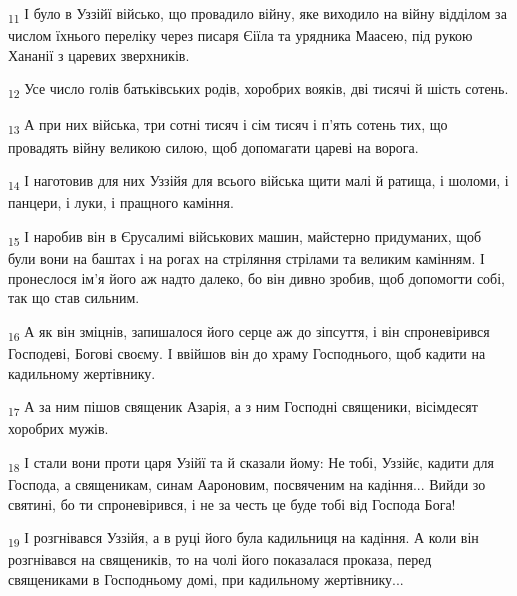\begin{tcolorbox}
\textsubscript{11} І було в Уззійї військо, що провадило війну, яке виходило на війну відділом за числом їхнього переліку через писаря Єіїла та урядника Маасею, під рукою Хананії з царевих зверхників.
\end{tcolorbox}
\begin{tcolorbox}
\textsubscript{12} Усе число голів батьківських родів, хоробрих вояків, дві тисячі й шість сотень.
\end{tcolorbox}
\begin{tcolorbox}
\textsubscript{13} А при них війська, три сотні тисяч і сім тисяч і п'ять сотень тих, що провадять війну великою силою, щоб допомагати цареві на ворога.
\end{tcolorbox}
\begin{tcolorbox}
\textsubscript{14} І наготовив для них Уззійя для всього війська щити малі й ратища, і шоломи, і панцери, і луки, і пращного каміння.
\end{tcolorbox}
\begin{tcolorbox}
\textsubscript{15} І наробив він в Єрусалимі військових машин, майстерно придуманих, щоб були вони на баштах і на рогах на стріляння стрілами та великим камінням. І пронеслося ім'я його аж надто далеко, бо він дивно зробив, щоб допомогти собі, так що став сильним.
\end{tcolorbox}
\begin{tcolorbox}
\textsubscript{16} А як він зміцнів, запишалося його серце аж до зіпсуття, і він спроневірився Господеві, Богові своєму. І ввійшов він до храму Господнього, щоб кадити на кадильному жертівнику.
\end{tcolorbox}
\begin{tcolorbox}
\textsubscript{17} А за ним пішов священик Азарія, а з ним Господні священики, вісімдесят хоробрих мужів.
\end{tcolorbox}
\begin{tcolorbox}
\textsubscript{18} І стали вони проти царя Узійї та й сказали йому: Не тобі, Уззійє, кадити для Господа, а священикам, синам Аароновим, посвяченим на кадіння... Вийди зо святині, бо ти спроневірився, і не за честь це буде тобі від Господа Бога!
\end{tcolorbox}
\begin{tcolorbox}
\textsubscript{19} І розгнівався Уззійя, а в руці його була кадильниця на кадіння. А коли він розгнівався на священиків, то на чолі його показалася проказа, перед священиками в Господньому домі, при кадильному жертівнику...
\end{tcolorbox}
